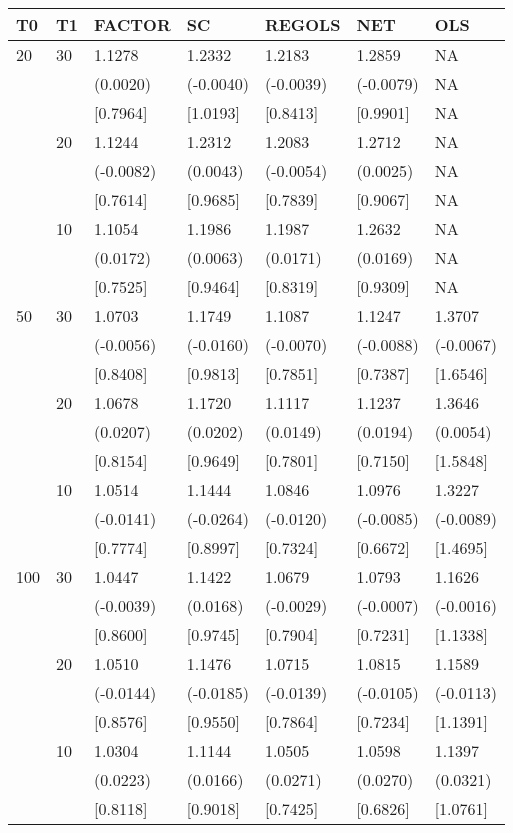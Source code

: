 \begin{table}[ht]
\centering
\begin{tabular}{lllllll}
\hline
T0&T1&FACTOR&SC&REGOLS&NET&OLS\\
\hline
20&30&1.1278&1.2332&1.2183&1.2859&NA\\
&&(0.0020)&(-0.0040)&(-0.0039)&(-0.0079)&NA\\
&&[0.7964]&[1.0193]&[0.8413]&[0.9901]&NA\\
&20&1.1244&1.2312&1.2083&1.2712&NA\\
&&(-0.0082)&(0.0043)&(-0.0054)&(0.0025)&NA\\
&&[0.7614]&[0.9685]&[0.7839]&[0.9067]&NA\\
&10&1.1054&1.1986&1.1987&1.2632&NA\\
&&(0.0172)&(0.0063)&(0.0171)&(0.0169)&NA\\
&&[0.7525]&[0.9464]&[0.8319]&[0.9309]&NA\\

50&30&1.0703&1.1749&1.1087&1.1247&1.3707\\
&&(-0.0056)&(-0.0160)&(-0.0070)&(-0.0088)&(-0.0067)\\
&&[0.8408]&[0.9813]&[0.7851]&[0.7387]&[1.6546]\\
&20&1.0678&1.1720&1.1117&1.1237&1.3646\\
&&(0.0207)&(0.0202)&(0.0149)&(0.0194)&(0.0054)\\
&&[0.8154]&[0.9649]&[0.7801]&[0.7150]&[1.5848]\\
&10&1.0514&1.1444&1.0846&1.0976&1.3227\\
&&(-0.0141)&(-0.0264)&(-0.0120)&(-0.0085)&(-0.0089)\\
&&[0.7774]&[0.8997]&[0.7324]&[0.6672]&[1.4695]\\

100&30&1.0447&1.1422&1.0679&1.0793&1.1626\\
&&(-0.0039)&(0.0168)&(-0.0029)&(-0.0007)&(-0.0016)\\
&&[0.8600]&[0.9745]&[0.7904]&[0.7231]&[1.1338]\\
&20&1.0510&1.1476&1.0715&1.0815&1.1589\\
&&(-0.0144)&(-0.0185)&(-0.0139)&(-0.0105)&(-0.0113)\\
&&[0.8576]&[0.9550]&[0.7864]&[0.7234]&[1.1391]\\
&10&1.0304&1.1144&1.0505&1.0598&1.1397\\
&&(0.0223)&(0.0166)&(0.0271)&(0.0270)&(0.0321)\\
&&[0.8118]&[0.9018]&[0.7425]&[0.6826]&[1.0761]\\
\hline
\end{tabular}
\end{table}


